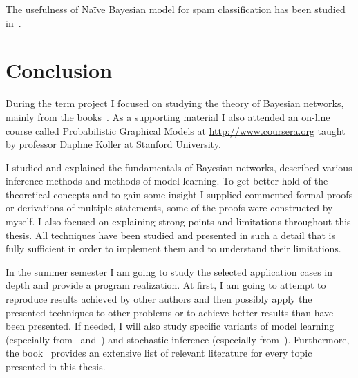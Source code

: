\documentclass[english,cover]{fitthesis} %
\newcommand{\todo}[1]{{\color{red}#1}}
\begin{document}
The usefulness of Naïve Bayesian model for spam classification has been studied in~\cite{heckerman98_spam}.

\chapter{Conclusion}
During the term project I focused on studying the theory of Bayesian networks, mainly from the books~\cite{pgm,russell_norvig_ed2}. As a supporting material I also attended an on-line course called Probabilistic Graphical Models at \url{http://www.coursera.org} taught by professor Daphne Koller at Stanford University.

I studied and explained the fundamentals of Bayesian networks, described various inference methods and methods of model learning. To get better hold of the theoretical concepts and to gain some insight I supplied commented formal proofs or derivations of multiple statements, some of the proofs were constructed by myself. I also focused on explaining strong points and limitations throughout this thesis. All techniques have been studied and presented in such a detail that is fully sufficient in order to implement them and to understand their limitations.

\medskip

In the summer semester I am going to study the selected application cases in depth and provide a program realization. At first, I am going to attempt to reproduce results achieved by other authors and then possibly apply the presented techniques to other problems or to achieve better results than have been presented. If needed, I will also study specific variants of model learning (especially from~\cite{heckerman96} and~\cite{buntine94}) and stochastic inference (especially from~\cite{neal93}). Furthermore, the book~\cite{pgm} provides an extensive list of relevant literature for every topic presented in this thesis. %
\end{document}
